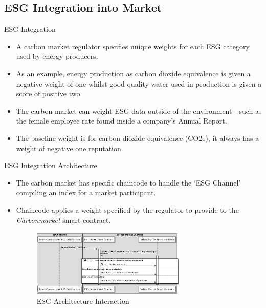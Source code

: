 \subsection{ESG Integration into Market}
\begin{frame}{ESG Integration}
    \begin{itemize}
        \item A carbon market regulator specifies unique weights for
              each ESG category used by energy producers.
        \item As an example, energy production as carbon dioxide
              equivalence is given a negative weight of one whilst good
              quality water used in production is given a score
              of positive two.
        \item The carbon market can weight ESG data outside of the
              environment - such as the female employee rate found
              inside a company's Annual Report.
        \item The baseline weight is for carbon dioxide equivalence (CO2e), it
              always has a weight of negative one reputation.
    \end{itemize}
\end{frame}
\begin{frame}{ESG Integration Architecture}
    \begin{itemize}
        \item The carbon market has specific chaincode to handle
              the `ESG Channel' compiling an index for a market
              participant.
        \item Chaincode applies a weight specified by the regulator
              to provide to the \textit{Carbonmarket} smart contract.
              \begin{figure}
                  \caption{ESG Architecture Interaction}
                  \centering
                  \includegraphics[height=0.4\textheight, width=0.7\textwidth]
                  {figures/reputation.png}
              \end{figure}
    \end{itemize}
\end{frame}
